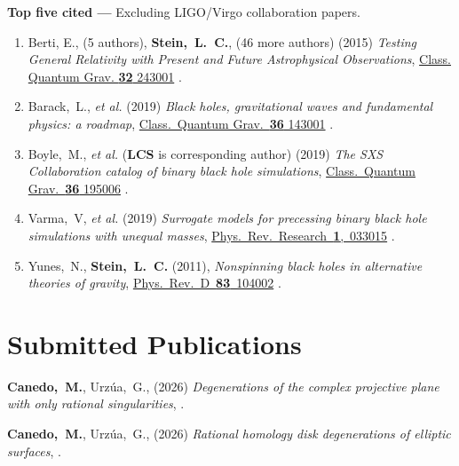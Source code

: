 {\bf Top five cited ---}%
Excluding LIGO/Virgo collaboration papers.
\begin{enumerate}
\item
  Berti, E., (5 authors), {\bf Stein,~L.~C.}, (46 more authors)
  (2015)
  {\it Testing General Relativity with Present and Future
    Astrophysical Observations},
  \href{http://dx.doi.org/10.1088/0264-9381/32/24/243001}{Class. Quantum Grav. {\bf 32} 243001}
  .
\item
  Barack,~L., {\it et al.}
  (2019)
  {\it Black holes, gravitational waves and fundamental physics: a roadmap},
  \href{https://doi.org/10.1088/1361-6382/ab0587}{Class.~Quantum Grav.~{\bf 36} 143001}
  .
\item
  Boyle,~M., {\it et al.} ({\bf LCS} is corresponding author)
  (2019)
  {\it The SXS Collaboration catalog of binary black hole simulations},
  \href{https://doi.org/10.1088/1361-6382/ab34e2}{Class.~Quantum Grav.~{\bf 36} 195006}
  .
\item
  Varma,~V, {\it et al.}
  (2019)
  {\it Surrogate models for precessing binary black hole simulations with
  unequal masses},
  \href{https://doi.org/10.1103/PhysRevResearch.1.033015}{Phys.~Rev.~Research~{\bf 1},~033015}
  .
\item
  Yunes,~N., {\bf Stein,~L.~C.}
  (2011),
  {\it Nonspinning black holes in alternative theories of gravity},
  \href{http://dx.doi.org/10.1103/PhysRevD.83.104002}{Phys.~Rev.~D~{\bf 83}~104002}
  .
\end{enumerate}
\else%
\fi

\renewcommand{\citeCount}[1]{}

\section{Submitted Publications}
\secstartswithlist{}%
\addtocounter{pubCounter}{-1}%
\begin{etaremune}[start=\value{pubCounter}]
\item
  {\bf Canedo,~M.},
  Urzúa,~G.,
  (2026)
  {\it Degenerations of the complex projective plane with only rational singularities},
  .
  \citeCount{0}
\item
  {\bf Canedo,~M.},
  Urzúa,~G.,
  (2026)
  {\it Rational homology disk degenerations of elliptic surfaces},
  .
  \citeCount{0}
  \setcounter{pubCounter}{\value{enumi}}
\end{etaremune}

